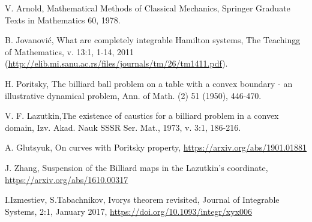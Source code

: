 \documentclass[11pt]{article}
\begin{document}
\begin{thebibliography}{99}

  V. Arnold, Mathematical Methods of Classical Mechanics, Springer Graduate Texts in Mathematics 60,  1978.

B. Jovanovi\'c,  What are completely integrable Hamilton systems,  The Teachingg of Mathematics, v. 13:1,  1-14, 2011 (\url{http://elib.mi.sanu.ac.rs/files/journals/tm/26/tm1411.pdf}).

 H.  Poritsky,  The billiard ball problem on a table with a convex boundary -  an illustrative dynamical problem,  Ann. of Math. (2) 51 (1950), 446-470.


 V. F. Lazutkin,The existence of caustics for a billiard problem in a convex domain, 	Izv. Akad. Nauk SSSR Ser. Mat., 1973,	v. 3:1,	 186-216.	 

	A. Glutsyuk,  On curves with Poritsky property,  \url{https://arxiv.org/abs/1901.01881}



  J. Zhang, Suspension of the Billiard maps in the Lazutkin's coordinate, \url{ https://arxiv.org/abs/1610.00317}

 I.Izmestiev,  S.Tabachnikov,  Ivorys theorem revisited,  
Journal of Integrable Systems,  2:1, January 2017,  \url{https://doi.org/10.1093/integr/xyx006}
 





\end{thebibliography}
\end{document}
